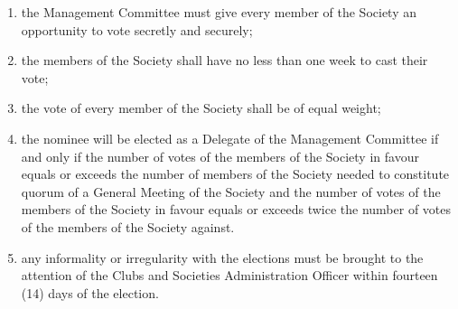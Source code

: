 \documentclass[a4paper]{article}
\begin{document}
\begin{enumerate}
\begin{enumerate}
	\item the Management Committee must give every member of the Society an opportunity to vote secretly and securely;
	\item the members of the Society shall have no less than one week to cast their vote;
	\item the vote of every member of the Society shall be of equal weight;
	\item the nominee will be elected as a Delegate of the Management Committee if and only if the number of votes of the members of the Society in favour equals or exceeds the number of members of the Society needed to constitute quorum of a General Meeting of the Society and the number of votes of the members of the Society in favour equals or exceeds twice the number of votes of the members of the Society against.
	\item any informality or irregularity with the elections must be brought to the attention of the Clubs and Societies Administration Officer within fourteen (14) days of the election.
	\end{enumerate}
\end{enumerate}
\end{document}
